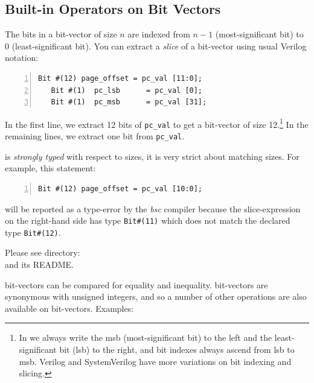 \subsection{Built-in Operators on Bit Vectors}

\label{Bit_Vector_Ops}

The bits in a {\BSV} bit-vector of size $n$ are indexed from $n-1$
(most-significant bit) to 0 (least-significant bit).  You can extract
a \emph{slice} of a bit-vector using usual Verilog notation:


{\footnotesize
\begin{Verbatim}[frame=single, numbers=left]
   Bit #(12) page_offset = pc_val [11:0];
   Bit #(1)  pc_lsb      = pc_val [0];
   Bit #(1)  pc_msb      = pc_val [31];
\end{Verbatim}
}

In the first line, we extract 12 bits of \verb|pc_val| to get a
bit-vector of size 12.\footnote{In {\BSV} we always write the msb
(most-significant bit) to the left and the least-significant bit (lsb)
to the right, and bit indexes always ascend from lsb to msb.  Verilog
and SystemVerilog have more variations on bit indexing and slicing.}
In the remaining lines, we extract one bit from \verb|pc_val|.

{\BSV} is \emph{strongly typed} with respect to sizes, {\ie} it is very
strict about matching sizes.  For example, this statement:

{\footnotesize
\begin{Verbatim}[frame=single, numbers=left]
   Bit #(12) page_offset = pc_val [10:0];
\end{Verbatim}
}

will be reported as a type-error by the \emph{bsc} compiler because
the slice-expression on the right-hand side has type \verb|Bit#(11)|
which does not match the declared type \verb|Bit#(12)|.

\Beginexercise

Please see directory:  \\
and its README.
\Endexercise

{\BSV} bit-vectors can be compared for equality and inequality.  {\BSV}
bit-vectors are synonymous with unsigned integers, and so a number of
other operations are also available on bit-vectors.  Examples:

